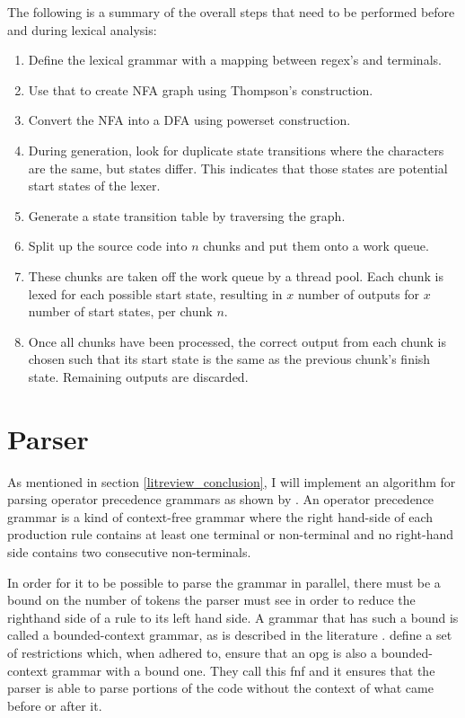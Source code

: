 The following is a summary of the overall steps that need to be performed before
and during lexical analysis:

\begin{enumerate}
\item Define the lexical grammar with a mapping between regex's and terminals.
\item Use that to create NFA graph using Thompson's construction.
\item Convert the NFA into a DFA using powerset construction.
\item During generation, look for duplicate state transitions where the
	  characters are the same, but states differ. This indicates that those
	  states are potential start states of the lexer.
\item Generate a state transition table by traversing the graph.
\item Split up the source code into $n$ chunks and put them onto a work queue.
\item These chunks are taken off the work queue by a thread pool. Each chunk
	  is lexed for each possible start state, resulting in $x$ number of outputs for $x$
	  number of start states, per chunk $n$.
\item Once all chunks have been processed, the correct output from each chunk is
	  chosen such that its start state is the same as the previous chunk's finish
	  state. Remaining outputs are discarded.
\end{enumerate}

\section{Parser} \label{design_parser}

As mentioned in section \ref{litreview_conclusion}, I will implement
an algorithm for parsing operator precedence grammars as shown by
\cite{barenghi_parallel_2015}. An operator precedence grammar is a kind of
context-free grammar where the right hand-side of each production rule contains
at least one terminal or non-terminal and no right-hand side contains two
consecutive non-terminals. 

In order for it to be possible to parse the grammar in parallel, there must
be a bound on the number of tokens the parser must see in order to reduce
the righthand side of a rule to its left hand side. A grammar that has such a
bound is called a bounded-context grammar, as is described in the literature
\citep{grune_parsing_2008}. \cite{barenghi_parallel_2015} define a set of
restrictions which, when adhered to, ensure that an \gls{opg} is also a
bounded-context grammar with a bound one. They call this \gls{fnf} and it
ensures that the parser is able to parse portions of the code without the
context of what came before or after it.

